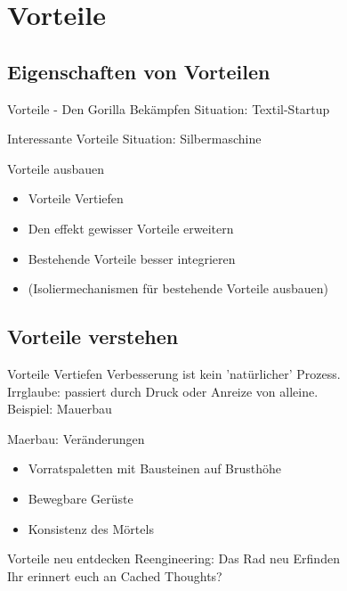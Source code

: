 \section{Vorteile}

\subsection{Eigenschaften von Vorteilen}

\begin{frame}[c]{Vorteile - Den Gorilla Bekämpfen}
    \Large
    Situation: Textil-Startup
\end{frame}

\begin{frame}[c]{Interessante Vorteile}
    \Large
    Situation: Silbermaschine
\end{frame}


\begin{frame}[c]{Vorteile ausbauen}
    \Large
    \begin{itemize}
        \item Vorteile Vertiefen
        \item Den effekt gewisser Vorteile erweitern
        \item Bestehende Vorteile besser integrieren
            \pause
        \item (Isoliermechanismen für bestehende Vorteile ausbauen)
    \end{itemize}
\end{frame}

\subsection{Vorteile verstehen}

\begin{frame}[c]{Vorteile Vertiefen}
    \Large
    Verbesserung ist kein 'natürlicher' Prozess. \\
    Irrglaube: passiert durch Druck oder Anreize von alleine. \\ \pause
    Beispiel: Mauerbau
\end{frame}


\begin{frame}[c]{Maerbau: Veränderungen}
    \Large
    \begin{itemize}
        \item Vorratspaletten mit Bausteinen auf Brusthöhe
        \item Bewegbare Gerüste
        \item Konsistenz des Mörtels
    \end{itemize}
\end{frame}


\begin{frame}[c]{Vorteile neu entdecken}
    \Large
    Reengineering: Das Rad neu Erfinden \\ \pause
    Ihr erinnert euch an Cached Thoughts?
\end{frame}



